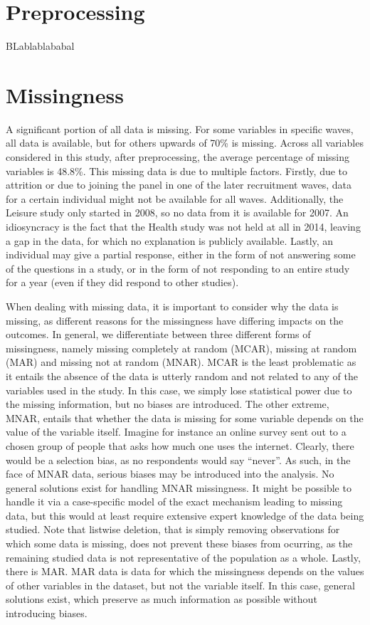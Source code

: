 \section{Preprocessing}
\label{sec:data:preprocessing}
BLablablababal

\section{Missingness}
\label{sec:data:missingness}
A significant portion of all data is missing. For some variables in specific waves, all data is available,
but for others upwards of 70\% is missing. Across all variables considered in this study, after preprocessing,
the average percentage of missing variables is 48.8\%.
This missing data is due to multiple factors. Firstly, due to attrition or due to joining the panel
in one of the later recruitment waves, data for a certain individual might not be available for all waves.
Additionally, the Leisure study only started in 2008, so no data from it is available for 2007. An idiosyncracy is
the fact that the Health study was not held at all in 2014, leaving a gap in the data, for which no explanation is publicly
available.
Lastly, an individual may give a partial response, either in the form of not answering some of the questions in a study,
or in the form of not responding to an entire study for a year (even if they did respond to other studies).

When dealing with missing data, it is important to consider why the data is missing, as different reasons for the missingness
have differing impacts on the outcomes. In general, we differentiate between three different forms of missingness,
namely missing completely at random (MCAR), missing at random (MAR) and missing not at random (MNAR).
MCAR is the least problematic as it entails the absence of the data is utterly random and not related to any of the
variables used in the study. In this case, we simply lose statistical power due to the missing information, but
no biases are introduced.
The other extreme, MNAR, entails that whether the data is missing for some variable depends on the value of the variable itself.
Imagine for instance an online survey sent out to a chosen group of people that asks how much one uses the internet.
Clearly, there would be a selection bias, as no respondents would say ``never''.
As such, in the face of MNAR data, serious biases may be introduced into the analysis. No general solutions exist for handling
MNAR missingness. It might be possible to handle it via a case-specific model of the exact mechanism leading to missing data,
but this would at least require extensive expert knowledge of the data being studied. Note that listwise deletion,
that is simply removing observations for which some data is missing, does not prevent these biases from ocurring,
as the remaining studied data is not representative of the population as a whole.
Lastly, there is MAR. MAR data is data for which the missingness depends on the values of other variables in the dataset,
but not the variable itself. In this case, general solutions exist, which preserve as much information as possible
without introducing biases.

